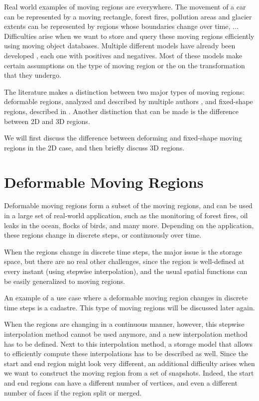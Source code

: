 Real world examples of moving regions are everywhere. The movement of a car can be represented by a moving rectangle, forest fires, pollution areas and glacier extents can be represented by regions whose boundaries change over time, ... Difficulties arise when we want to store and query these moving regions efficiently using moving object databases. Multiple different models have already been developed , each one with positives and negatives. Most of these models make certain assumptions on the type of moving region or the on the transformation that they undergo.

The literature makes a distinction between two major types of moving regions: deformable regions, analyzed and described by multiple authors , and fixed-shape regions, described in . Another distinction that can be made is the difference between 2D and 3D regions. 

We will first discuss the difference between deforming and fixed-shape moving regions in the 2D case, and then briefly discuss 3D regions.

\section{Deformable Moving Regions}

Deformable moving regions form a subset of the moving regions, and can be used in a large set of real-world application, such as the monitoring of forest fires, oil leaks in the ocean, flocks of birds, and many more. Depending on the application, these regions change in discrete steps, or continuously over time. 

When the regions change in discrete time steps, the major issue is the storage space, but there are no real other challenges, since the region is well-defined at every instant (using stepwise interpolation), and the usual spatial functions can be easily generalized to moving regions.

An example of a use case where a deformable moving region changes in discrete time steps is a cadastre. This type of moving regions will be discussed later again.

When the regions are changing in a continuous manner, however, this stepwise interpolation method cannot be used anymore, and a new interpolation method has to be defined. Next to this interpolation method, a storage model that allows to efficiently compute these interpolations has to be described as well. Since the start and end region might look very different, an additional difficulty arises when we want to construct the moving region from a set of snapshots. Indeed, the start and end regions can have a different number of vertices, and even a different number of faces if the region split or merged.

